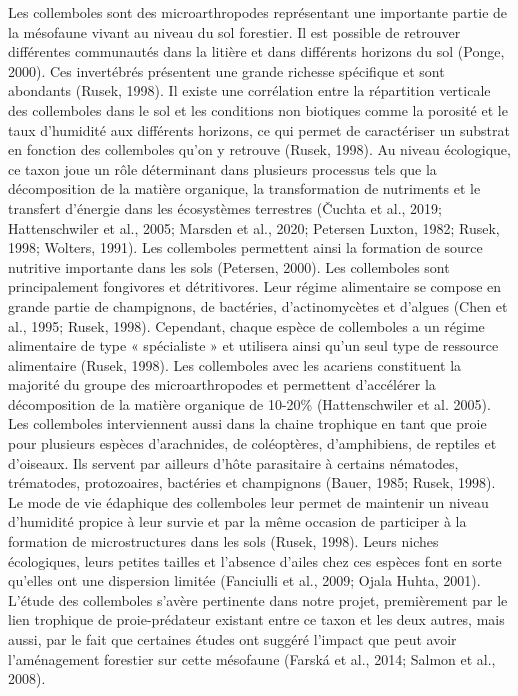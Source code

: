 Les collemboles sont des microarthropodes représentant une importante partie de la mésofaune vivant au niveau du sol forestier. 
Il est possible de retrouver différentes communautés dans la litière et dans différents horizons du sol (Ponge, 2000).  
Ces invertébrés présentent une grande richesse spécifique et sont abondants (Rusek, 1998). 
Il existe une corrélation entre la répartition verticale des collemboles dans le sol et les conditions non biotiques comme la porosité et le 
taux d’humidité aux différents horizons, ce qui permet de caractériser un substrat en fonction des collemboles qu’on y retrouve (Rusek, 1998). 
Au niveau écologique, ce taxon joue un rôle déterminant dans plusieurs processus tels que la décomposition de la matière organique, la transformation 
de nutriments et le transfert d’énergie dans les écosystèmes terrestres 
(Čuchta et al., 2019; Hattenschwiler et al., 2005; Marsden et al., 2020; Petersen Luxton, 1982; Rusek, 1998; Wolters, 1991). 
Les collemboles permettent ainsi la formation de source nutritive importante dans les sols (Petersen, 2000). 
Les collemboles sont principalement fongivores et détritivores. Leur régime alimentaire se compose en grande partie de champignons, de bactéries, 
d’actinomycètes et d’algues (Chen et al., 1995; Rusek, 1998). Cependant, chaque espèce de collemboles a un régime alimentaire de type « spécialiste » 
et utilisera ainsi qu’un seul type de ressource alimentaire (Rusek, 1998). Les collemboles avec les acariens constituent la majorité du groupe 
des microarthropodes et permettent d’accélérer la décomposition de la matière organique de 10-20\% (Hattenschwiler et al. 2005). 
Les collemboles interviennent aussi dans la chaine trophique en tant que proie pour plusieurs espèces d’arachnides, de coléoptères, 
d’amphibiens, de reptiles et d’oiseaux. Ils servent par ailleurs d’hôte parasitaire à certains nématodes, trématodes, protozoaires, bactéries et 
champignons (Bauer, 1985; Rusek, 1998). Le mode de vie édaphique des collemboles leur permet de maintenir un niveau d’humidité propice à leur survie 
et par la même occasion de participer à la formation de microstructures dans les sols (Rusek, 1998). Leurs niches écologiques, 
leurs petites tailles et l’absence d’ailes chez ces espèces font en sorte qu’elles ont une dispersion limitée (Fanciulli et al., 2009; Ojala Huhta, 2001). 
L’étude des collemboles s’avère pertinente dans notre projet,  premièrement par le lien trophique de proie-prédateur existant entre ce taxon et les deux autres, 
mais aussi, par le fait que certaines études ont suggéré l’impact que peut avoir l’aménagement forestier sur cette mésofaune 
(Farská et al., 2014; Salmon et al., 2008). 

